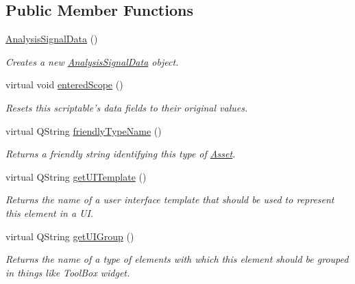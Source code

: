 \subsection*{Public Member Functions}
\begin{DoxyCompactItemize}
\item 
\hyperlink{class_picto_1_1_analysis_signal_data_a0a3ace8a3ed2d01a170fb8f1c399b96f}{Analysis\-Signal\-Data} ()
\begin{DoxyCompactList}\small\item\em Creates a new \hyperlink{class_picto_1_1_analysis_signal_data}{Analysis\-Signal\-Data} object. \end{DoxyCompactList}\item 
virtual void \hyperlink{class_picto_1_1_analysis_signal_data_a4de3c66b089610d0dab11d1af533eee6}{entered\-Scope} ()
\begin{DoxyCompactList}\small\item\em Resets this scriptable's data fields to their original values. \end{DoxyCompactList}\item 
virtual Q\-String \hyperlink{class_picto_1_1_analysis_signal_data_a0edb8e94cc696a17e719ca7d134ff192}{friendly\-Type\-Name} ()
\begin{DoxyCompactList}\small\item\em Returns a friendly string identifying this type of \hyperlink{class_picto_1_1_asset}{Asset}. \end{DoxyCompactList}\item 
\hypertarget{class_picto_1_1_analysis_signal_data_ad127f248be06212ae4920ab67926de75}{virtual Q\-String \hyperlink{class_picto_1_1_analysis_signal_data_ad127f248be06212ae4920ab67926de75}{get\-U\-I\-Template} ()}\label{class_picto_1_1_analysis_signal_data_ad127f248be06212ae4920ab67926de75}

\begin{DoxyCompactList}\small\item\em Returns the name of a user interface template that should be used to represent this element in a U\-I. \end{DoxyCompactList}\item 
\hypertarget{class_picto_1_1_analysis_signal_data_a32e49b81361a84e8babb3c4a24d847fb}{virtual Q\-String \hyperlink{class_picto_1_1_analysis_signal_data_a32e49b81361a84e8babb3c4a24d847fb}{get\-U\-I\-Group} ()}\label{class_picto_1_1_analysis_signal_data_a32e49b81361a84e8babb3c4a24d847fb}

\begin{DoxyCompactList}\small\item\em Returns the name of a type of elements with which this element should be grouped in things like Tool\-Box widget. \end{DoxyCompactList}\end{DoxyCompactItemize}

